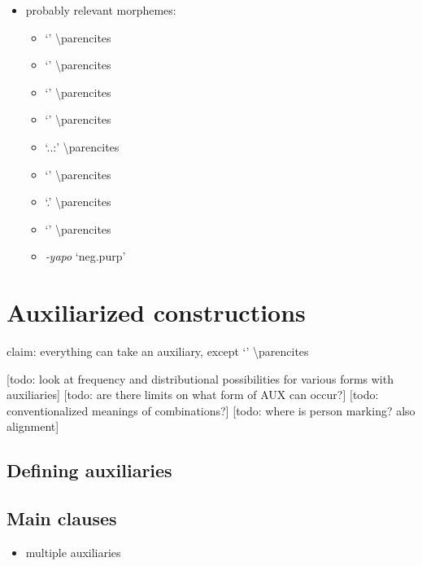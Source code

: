 \documentclass{memoir}
\begin{document}
\begin{itemize}
\tightlist
\item
  probably relevant morphemes:

  \begin{itemize}
  \tightlist
  \item
     `' \textbackslash parencites
  \item
     `' \textbackslash parencites
  \item
     `' \textbackslash parencites
  \item
     `' \textbackslash parencites
  \item
     `..:'
    \textbackslash parencites
  \item
     `' \textbackslash parencites
  \item
     `.' \textbackslash parencites
  \item
     `' \textbackslash parencites
  \item
    \emph{‑yapo} `neg.purp'
  \end{itemize}
\end{itemize}

\chapter{Auxiliarized constructions}

claim: everything can take an auxiliary, except  `'
\textbackslash parencites

{[}todo: look at frequency and distributional possibilities for various
forms with auxiliaries{]} {[}todo: are there limits on what form of AUX
can occur?{]} {[}todo: conventionalized meanings of combinations?{]}
{[}todo: where is person marking? also alignment{]}

\section{Defining auxiliaries}

\section{Main clauses}

\begin{itemize}
\tightlist
\item
  multiple auxiliaries
\end{itemize}
\end{document}
